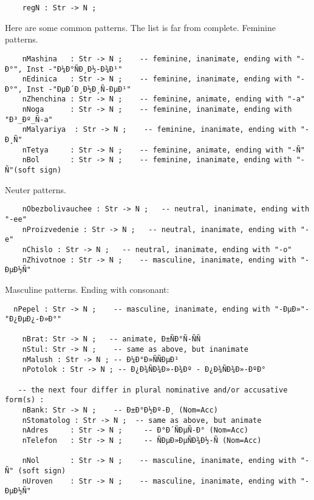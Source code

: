 \documentclass[11pt,a4paper]{article}
\begin{document}
\begin{verbatim}
    regN : Str -> N ;
\end{verbatim}

Here are some common patterns. The list is far from complete.
Feminine patterns.

\begin{verbatim}
    nMashina   : Str -> N ;    -- feminine, inanimate, ending with "-Ð°", Inst -"Ð¼Ð°ÑÐ¸Ð½-Ð¾Ð¹"
    nEdinica   : Str -> N ;    -- feminine, inanimate, ending with "-Ð°", Inst -"ÐµÐ´Ð¸Ð½Ð¸Ñ-ÐµÐ¹"
    nZhenchina : Str -> N ;    -- feminine, animate, ending with "-a"
    nNoga      : Str -> N ;    -- feminine, inanimate, ending with "Ð³_Ðº_Ñ-a"
    nMalyariya  : Str -> N ;    -- feminine, inanimate, ending with "-Ð¸Ñ"   
    nTetya     : Str -> N ;    -- feminine, animate, ending with "-Ñ"   
    nBol       : Str -> N ;    -- feminine, inanimate, ending with "-Ñ"(soft sign)     
\end{verbatim}

Neuter patterns. 

\begin{verbatim}
    nObezbolivauchee : Str -> N ;   -- neutral, inanimate, ending with "-ee" 
    nProizvedenie : Str -> N ;   -- neutral, inanimate, ending with "-e" 
    nChislo : Str -> N ;   -- neutral, inanimate, ending with "-o" 
    nZhivotnoe : Str -> N ;    -- masculine, inanimate, ending with "-ÐµÐ½Ñ"
\end{verbatim}

Masculine patterns. 
Ending with consonant: 

\begin{verbatim}
  nPepel : Str -> N ;    -- masculine, inanimate, ending with "-ÐµÐ»"- "Ð¿ÐµÐ¿-Ð»Ð°"
  
    nBrat: Str -> N ;   -- animate, Ð±ÑÐ°Ñ-ÑÑ
    nStul: Str -> N ;    -- same as above, but inanimate
    nMalush : Str -> N ; -- Ð¼Ð°Ð»ÑÑÐµÐ¹
    nPotolok : Str -> N ; -- Ð¿Ð¾ÑÐ¾Ð»-Ð¾Ðº - Ð¿Ð¾ÑÐ¾Ð»-ÐºÐ°
  
   -- the next four differ in plural nominative and/or accusative form(s) :
    nBank: Str -> N ;    -- Ð±Ð°Ð½Ðº-Ð¸ (Nom=Acc)
    nStomatolog : Str -> N ;  -- same as above, but animate
    nAdres     : Str -> N ;     -- Ð°Ð´ÑÐµÑ-Ð° (Nom=Acc)
    nTelefon   : Str -> N ;     -- ÑÐµÐ»ÐµÑÐ¾Ð½-Ñ (Nom=Acc)
  
    nNol       : Str -> N ;    -- masculine, inanimate, ending with "-Ñ" (soft sign)
    nUroven    : Str -> N ;    -- masculine, inanimate, ending with "-ÐµÐ½Ñ"
\end{verbatim}
\end{document}
